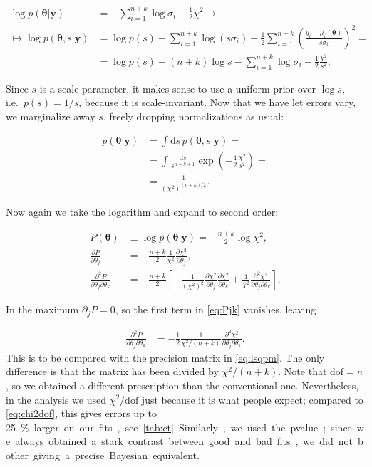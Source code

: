 \begin{align}
    \log p(\boldsymbol\theta|\mathbf y)
    &= -\sum_{i=1}^{n+k} \log\sigma_i - \frac12 \chi^2 \mapsto \\
    \mapsto \log p(\boldsymbol\theta,s|\mathbf y)
    &= \log p(s) -\sum_{i=1}^{n+k} \log(s \sigma_i)
    - \frac 12 \sum_{i=1}^{n+k}
    \left( \frac {y_i - \mu_i(\boldsymbol\theta)} {s \sigma_i} \right)^2 = \\
    &= \log p(s) - (n+k) \log s - \sum_{i=1}^{n+k} \log\sigma_i
    - \frac 12 \frac{\chi^2}{s^2}.
\end{align}

Since $s$ is a scale parameter, it makes sense to use a uniform prior over
$\log s$, i.e.\ $p(s) = 1/s$, because it is scale-invariant. Now that we have
let errors vary, we marginalize away $s$, freely dropping normalizations as
usual:

\begin{align}
    p(\boldsymbol\theta|\mathbf y)
    &= \int \mathrm ds\,
    p(\boldsymbol\theta,s|\mathbf y) = \\
    &= \int \frac {\mathrm ds} {s^{n+k+1}}
    \exp\left(-\frac12 \frac {\chi^2} {s^2}\right) = \\
    &= \frac 1 {(\chi^2)^{(n+k)/2}}.
\end{align}

Now again we take the logarithm and expand to second order:

\begin{align}
    P(\boldsymbol\theta) &\equiv
    \log p(\boldsymbol\theta|\mathbf y)
    = -\frac{n+k}2 \log \chi^2, \\
    \frac {\partial P} {\partial \theta_j}
    &= -\frac{n+k}2 \frac 1{\chi^2}
    \frac {\partial \chi^2} {\partial \theta_j}, \\
    \frac {\partial^2 P} {\partial\theta_j \partial\theta_k}
    &= -\frac{n+k}2 \left[
    -\frac 1 {(\chi^2)^2}
    \frac {\partial \chi^2} {\partial \theta_j}
    \frac {\partial \chi^2} {\partial \theta_k}
    + \frac 1{\chi^2}
    \frac {\partial^2 \chi^2} {\partial\theta_j \partial\theta_k}
    \right]. \label{eq:Pjk}
\end{align}

In the maximum $\partial_j P = 0$, so the first term in \eqref{eq:Pjk}
vanishes, leaving

\begin{align}
    \frac {\partial^2 P} {\partial\theta_j \partial\theta_k}
    &= -\frac12 \frac 1 {\chi^2/(n+k)}
    \frac {\partial^2 \chi^2} {\partial\theta_j \partial\theta_k}.
    \label{eq:chi2dof}
\end{align}
%
This is to be compared with the precision matrix in \eqref{eq:lsqpm}. The
only difference is that the matrix has been divided by $\chi^2/(n+k)$. Note
that $\mathrm{dof} = n$, so we obtained a different prescription than the
conventional one. Nevertheless, in the analysis we used $\chi^2/\mathrm{dof}$
just because it is what people expect; compared to \eqref{eq:chi2dof}, this
gives errors up to \SI{25}\% larger on our fits, see \autoref{tab:ct}.

Similarly, we used the pvalue; since we always obtained a stark contrast
between good and bad fits, we did not bother giving a precise Bayesian
equivalent.
